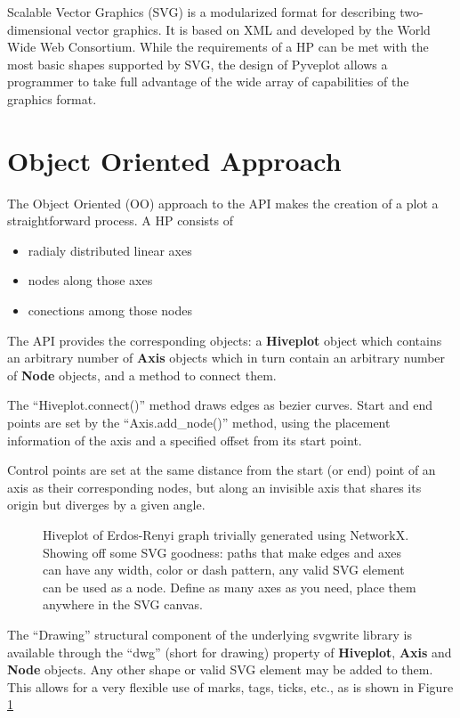 \documentclass{bioinfo}
\begin{document}
Scalable Vector Graphics (SVG) is a modularized format for describing
two-dimensional vector graphics. It is based on XML and developed by
the World Wide Web Consortium. \cite{McCormack:11:SVG} While the
requirements of a HP can be met with the most basic shapes supported
by SVG, the design of Pyveplot allows a programmer to take full
advantage of the wide array of capabilities of the graphics format.


\section{Object Oriented Approach}

The Object Oriented (OO) approach to the API makes the creation of a
plot a straightforward process. A HP consists of
\begin{itemize}
\item radialy distributed linear axes
\item nodes along those axes
\item conections among those nodes
\end{itemize}
The API provides the corresponding objects: a {\bfseries Hiveplot} object
which contains an arbitrary number of {\bfseries Axis} objects which in
turn contain an arbitrary number of {\bfseries Node} objects, and a method
to connect them.

The ``Hiveplot.connect()'' method draws edges as bezier curves. Start and
end points are set by the ``Axis.add\_node()'' method, using the placement
information of the axis and a specified offset from its start point.

Control points are set at the same distance from the start (or end)
point of an axis as their corresponding nodes, but along an invisible
axis that shares its origin but diverges by a given angle.


\begin{figure}[!tpb]%
  \caption{Hiveplot of Erdos-Renyi graph trivially generated using
    NetworkX. Showing off some SVG goodness: paths that make edges
    and axes can have any width, color or dash pattern, any valid SVG
    element can be used as a node. Define as many axes as you need,
    place them anywhere in the SVG canvas.}\label{fig:01}
\end{figure}

The ``Drawing'' structural component of the underlying svgwrite
library is available through the ``dwg'' (short for drawing) property
of {\bfseries Hiveplot}, {\bfseries Axis} and {\bfseries Node}
objects. Any other shape or valid SVG element may be added to them.
This allows for a very flexible use of marks, tags, ticks, etc., as is
shown in Figure \ref{fig:01}
\end{document}
